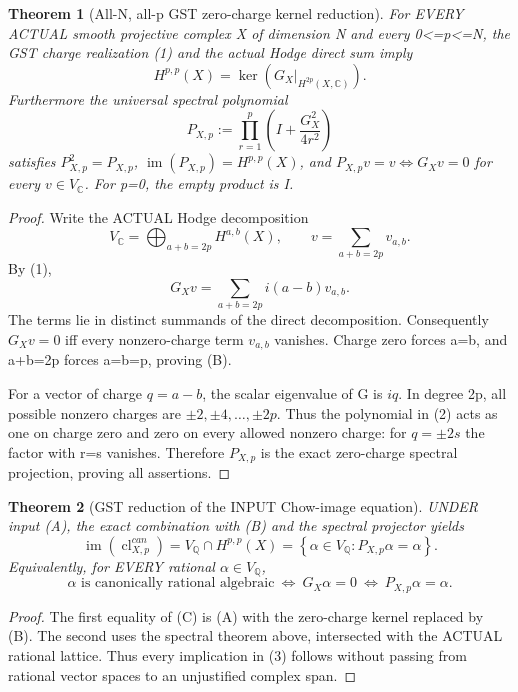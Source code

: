 \documentclass[11pt]{article}
\newcommand{\Q}{\mathbb Q}
\newcommand{\C}{\mathbb C}
\newcommand{\im}{\operatorname{im}}
\newtheorem{theorem}{Theorem}
\begin{document}
\begin{theorem}[All-N, all-p GST zero-charge kernel reduction]
For EVERY ACTUAL smooth projective complex X of
dimension N and every 0<=p<=N, the GST charge
realization (1) and the actual Hodge direct sum imply
\[
 \boxed{
 H^{p,p}(X)=
 \ker\!\left(G_X|_{H^{2p}(X,\C)}\right).
 }                                                \tag{B}
\]
Furthermore the universal spectral polynomial
\[
 \boxed{
 P_{X,p}:=\prod_{r=1}^{p}
   \left(I+\frac{G_X^2}{4r^2}\right)
 }                                                \tag{2}
\]
satisfies \(P_{X,p}^2=P_{X,p}\),
\(\im(P_{X,p})=H^{p,p}(X)\),
and \(P_{X,p}v=v\iff G_Xv=0\)
for every \(v\in V_{\C}\).
For p=0, the empty product is I.
\end{theorem}
\begin{proof}
Write the ACTUAL Hodge decomposition
\[
 V_{\C}=\bigoplus_{a+b=2p}H^{a,b}(X),
 \qquad v=\sum_{a+b=2p}v_{a,b}.
\]
By (1),
\[
 G_Xv=\sum_{a+b=2p}i(a-b)v_{a,b}.
\]
The terms lie in distinct summands of the
direct decomposition. Consequently \(G_Xv=0\)
iff every nonzero-charge term \(v_{a,b}\) vanishes.
Charge zero forces a=b, and a+b=2p forces a=b=p,
proving (B).

For a vector of charge \(q=a-b\), the scalar
eigenvalue of G is \(iq\).
In degree 2p, all possible nonzero charges are
\(\pm2,\pm4,\ldots,\pm2p\).
Thus the polynomial in (2) acts as one on charge
zero and zero on every allowed nonzero charge:
for \(q=\pm2s\) the factor with r=s vanishes.
Therefore \(P_{X,p}\) is the exact zero-charge
spectral projection, proving all assertions.
\end{proof}

\begin{theorem}[GST reduction of the INPUT Chow-image equation]
UNDER input (A), the exact combination with
(B) and the spectral projector yields
\[
 \boxed{
 \im(\operatorname{cl}^{can}_{X,p})
 =V_{\Q}\cap H^{p,p}(X)
 =\left\{\alpha\in V_{\Q}:P_{X,p}\alpha=\alpha\right\}.
 }                                                \tag{C}
\]
Equivalently, for EVERY rational \(\alpha\in V_{\Q}\),
\[
 \boxed{
 \alpha\text{ is canonically rational algebraic}
 \ \Longleftrightarrow\
 G_X\alpha=0
 \ \Longleftrightarrow\
 P_{X,p}\alpha=\alpha .
 }                                                \tag{3}
\]
\end{theorem}
\begin{proof}
The first equality of (C) is (A) with the
zero-charge kernel replaced by (B).
The second uses the spectral theorem above,
intersected with the ACTUAL rational lattice.
Thus every implication in (3) follows without
passing from rational vector spaces to an
unjustified complex span.
\end{proof}
\end{document}

